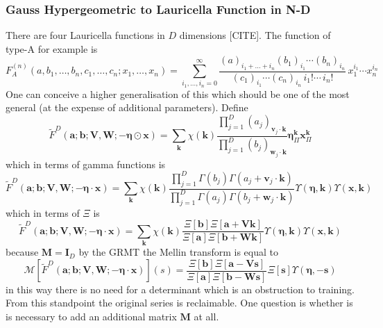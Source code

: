 \documentclass[journal=jcisd8,manuscript=article,layout=onecolumn,pdftex,floatfix,amsmath,amssymb,10pt]{achemso}
\begin{document}
\subsubsection{Gauss Hypergeometric to Lauricella Function in N-D}
There are four Lauricella functions in $D$ dimensions [CITE]. The function of type-A for example is
\begin{equation}
F_A^{(n)}(a, b_1,\ldots,b_n, c_1,\ldots,c_n; x_1,\ldots,x_n) = 
\sum_{i_1,\ldots,i_n=0}^{\infty} \frac{(a)_{i_1+\ldots+i_n} (b_1)_{i_1} \cdots (b_n)_{i_n}} {(c_1)_{i_1} \cdots (c_n)_{i_n} \,i_1! \cdots \,i_n!} \,x_1^{i_1} \cdots x_n^{i_n}
\end{equation}
One can conceive a higher generalisation of this which should be one of the most general (at the expense of additional parameters). Define
\begin{equation}
\tilde{F}^{D}(\mathbf{a};\mathbf{b};\mathbf{V,W};-\boldsymbol\eta \odot\mathbf{x}) = \sum_{\mathbf{k}} \chi(\mathbf{k})\frac{\prod_{j=1}^D (a_j)_{\mathbf{v}_j \cdot \mathbf{k}}}{\prod_{j=1}^D (b_j)_{\mathbf{w}_j \cdot \mathbf{k}}} \boldsymbol\eta^{\mathbf{k}}_\Pi\mathbf{x}^{\mathbf{k}}_\Pi
\end{equation}
which in terms of gamma functions is 
\begin{equation}
\tilde{F}^{D}(\mathbf{a};\mathbf{b};\mathbf{V,W};-\boldsymbol\eta \cdot\mathbf{x}) = \sum_{\mathbf{k}} \chi(\mathbf{k})\frac{\prod_{j=1}^D \Gamma(b_j)\Gamma(a_j + \mathbf{v}_j\cdot \mathbf{k})}{\prod_{j=1}^D \Gamma(a_j)\Gamma(b_j+\mathbf{w}_j\cdot \mathbf{k})} \Upsilon(\boldsymbol\eta,\mathbf{k})\Upsilon(\mathbf{x},\mathbf{k})
\end{equation}
which in terms of $\Xi$ is
\begin{equation}
\tilde{F}^{D}(\mathbf{a};\mathbf{b};\mathbf{V,W};-\boldsymbol\eta \cdot\mathbf{x}) = \sum_{\mathbf{k}} \chi(\mathbf{k})\frac{\Xi[\mathbf{b}]\Xi[\mathbf{a}+\mathbf{Vk}]}{\Xi[\mathbf{a}]\Xi[\mathbf{b+Wk}]} \Upsilon(\boldsymbol\eta,\mathbf{k})\Upsilon(\mathbf{x},\mathbf{k})
\end{equation}
because $\mathbf{M}=\mathbf{I}_D$ by the GRMT the Mellin transform is equal to \begin{equation}
\mathcal{M}[\tilde{F}^{D}(\mathbf{a};\mathbf{b};\mathbf{V,W};-\boldsymbol\eta \cdot\mathbf{x})](s) = \frac{\Xi[\mathbf{b}]\Xi[\mathbf{a}-\mathbf{Vs}]}{\Xi[\mathbf{a}]\Xi[\mathbf{b-Ws}]}\Xi[\mathbf{s}]\Upsilon(\boldsymbol\eta,-\mathbf{s})
\end{equation}
in this way there is no need for a determinant which is an obstruction to training. From this standpoint the original series is reclaimable. One question is whether is is necessary to add an additional matrix $\mathbf{M}$ at all.
\end{document}
